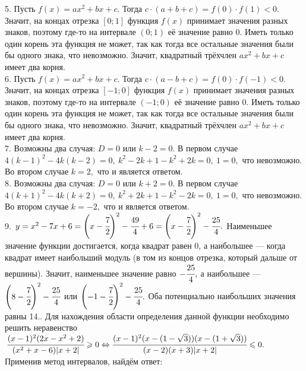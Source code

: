 \documentclass[12pt]{article}
\begin{document}
5. Пусть $f(x)=ax^2+bx+c.$ Тогда $c\cdot(a+b+c)=f(0)\cdot f(1)<0.$ Значит, на концах отрезка $[0;1]$ функция $f(x)$ принимает значения разных знаков, поэтому где-то на интервале $(0;1)$ её значение равно 0. Иметь только один корень эта функция не может, так как тогда все остальные значения были бы одного знака, что невозможно. Значит, квадратный трёхчлен $ax^2+bx+c$ имеет два корня.\\
6. Пусть $f(x)=ax^2+bx+c.$ Тогда $c\cdot(a-b+c)=f(0)\cdot f(-1)<0.$ Значит, на концах отрезка $[-1;0]$ функция $f(x)$ принимает значения разных знаков, поэтому где-то на интервале $(-1;0)$ её значение равно 0. Иметь только один корень эта функция не может, так как тогда все остальные значения были бы одного знака, что невозможно. Значит, квадратный трёхчлен $ax^2+bx+c$ имеет два корня.\\
7. Возможны два случая: $D=0$ или $k-2=0.$ В первом случае $4(k-1)^2-4k(k-2)=0,\ k^2-2k+1-k^2+2k=0,\ 1=0,$ что невозможно. Во втором случае $k=2,$ что и является ответом.\\
8. Возможны два случая: $D=0$ или $k+2=0.$ В первом случае $4(k+1)^2-4k(k+2)=0,\ k^2+2k+1-k^2-2k=0,\ 1=0,$ что невозможно. Во втором случае $k=-2,$ что и является ответом.\\
9. $y=x^2-7x+6=\left(x-\cfrac{7}{2}\right)^2-\cfrac{49}{4}+6=\left(x-\cfrac{7}{2}\right)^2-\cfrac{25}{4}.$ Наименьшее значение функции достигается, когда квадрат равен 0, а наибольшее --- когда квадрат имеет наибольший модуль (в том из концов отрезка, который дальше от вершины). Значит, наименьшее значение равно $-\cfrac{25}{4},$ а наибольшее ---
$\left(8-\cfrac{7}{2}\right)^2-\cfrac{25}{4}$ или $\left(-1-\cfrac{7}{2}\right)^2-\cfrac{25}{4}.$ Оба потенциально наибольших значения равны 14.\newpage{}. Для нахождения области определения данной функции необходимо решить неравенство\\ $\cfrac{(x-1)^2(2x-x^2+2)}{(x^2+x-6)|x+2|}\geqslant0\Leftrightarrow
\cfrac{(x-1)^2(x-(1-\sqrt{3}))(x-(1+\sqrt{3}))}{(x-2)(x+3)|x+2|}\leqslant0.$ Применив метод интервалов, найдём ответ:
\begin{figure}[ht!]
\end{figure}
\end{document}
